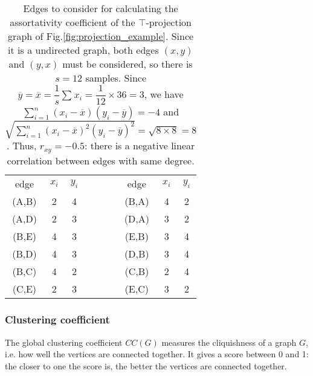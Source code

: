 \documentclass[table]{report}
\begin{document}
\begin{table}[h]
\centering
\begin{tabular}{ccclllccc}
\cline{1-3} \cline{7-9}
edge  & $x_i$ & $y_i$ &  &  &  & \multicolumn{1}{c}{edge} & $x_i$ & $y_i$ \\ \cline{1-3} \cline{7-9} 
(A,B) & 2   & 4   &  &  &  & (B,A)                     & 4   & 2   \\
(A,D) & 2   & 3   &  &  &  & (D,A)                     & 3   & 2   \\
(B,E) & 4   & 3   &  &  &  & (E,B)                     & 3   & 4   \\
(B,D) & 4   & 3   &  &  &  & (D,B)                     & 3   & 4   \\
(B,C) & 4   & 2   &  &  &  & (C,B)                     & 2   & 4   \\
(C,E) & 2   & 3   &  &  &  & (E,C)                     & 3   & 2   \\ \cline{1-3} \cline{7-9} 
\end{tabular}
\caption{Edges to consider for calculating the assortativity coefficient of the $\top$-projection graph of Fig.\ref{fig:projection_example}. Since it is a undirected graph, both edges $(x,y)$ and $(y,x)$ must be considered, so there is $s = 12$ samples. Since
$\overline{y} = \overline{x} = \dfrac{1}{s}  \sum_{} x_i = \dfrac{1}{12} \times 36 = 3$, we have
$\sum_{i=1}^{n} (x_{i}-\overline {x}) (y_{i}-\overline {y}) = -4 $ and
$\sqrt{\sum_{i=1}^{n} {(x_{i}-\overline {x})}^2
{(y_{i}-\overline {y})}^2} = \sqrt{8 \times 8} = 8$. Thus, $r_{xy} = -0.5$: there is a negative linear correlation between edges with same degree.}
\end{table}
\FloatBarrier 


\subsubsection{Clustering coefficient}

The global clustering coefficient $CC(G)$ measures the cliquishness of a graph $G$, i.e. how well the vertices are connected together. It gives a score between 0 and 1: the closer to one the score is, the better the vertices are connected together. 
\end{document}
